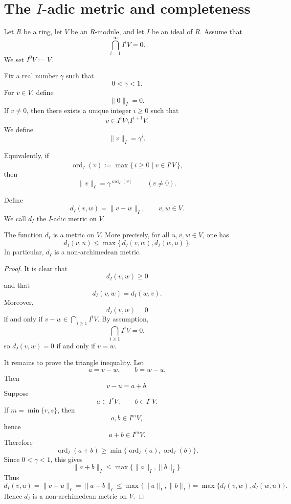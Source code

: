 \section{\texorpdfstring{The \(I\)-adic metric and completeness}{The I-adic metric and completeness}}

Let \(R\) be a ring, let \(V\) be an \(R\)-module, and let \(I\) be an ideal of \(R\).
Assume that
\[
    \bigcap_{i=1}^{\infty} I^i V = 0.
\]
We set \(I^0V:=V\).

Fix a real number \(\gamma\) such that
\[
    0<\gamma<1.
\]
For \(v\in V\), define
\[
    \|0\|_I=0.
\]
If \(v\neq 0\), then there exists a unique integer \(i\geq 0\) such that
\[
    v\in I^iV\setminus I^{i+1}V.
\]
We define
\[
    \|v\|_I=\gamma^i.
\]

Equivalently, if
\[
    \operatorname{ord}_I(v)
    :=
    \max\{\,i\geq 0\mid v\in I^iV\,\},
\]
then
\[
    \|v\|_I=\gamma^{\operatorname{ord}_I(v)}
    \qquad (v\neq 0).
\]

\begin{definition}
    Define
    \[
        d_I(v,w)=\|v-w\|_I,
        \qquad v,w\in V.
    \]
    We call \(d_I\) the \(I\)-adic metric on \(V\).
\end{definition}

\begin{proposition}
    The function \(d_I\) is a metric on \(V\). More precisely, for all
    \(u,v,w\in V\), one has
    \[
        d_I(v,u)
        \leq
        \max\{\,d_I(v,w),d_I(w,u)\,\}.
    \]
    In particular, \(d_I\) is a non-archimedean metric.
\end{proposition}

\begin{proof}
    It is clear that
    \[
        d_I(v,w)\geq 0
    \]
    and that
    \[
        d_I(v,w)=d_I(w,v).
    \]
    Moreover,
    \[
        d_I(v,w)=0
    \]
    if and only if \(v-w\in \bigcap_{i\geq 1} I^iV\). By assumption,
    \[
        \bigcap_{i\geq 1} I^iV=0,
    \]
    so \(d_I(v,w)=0\) if and only if \(v=w\).

    It remains to prove the triangle inequality. Let
    \[
        a=v-w,\qquad b=w-u.
    \]
    Then
    \[
        v-u=a+b.
    \]
    Suppose
    \[
        a\in I^rV,\qquad b\in I^sV.
    \]
    If \(m=\min\{r,s\}\), then
    \[
        a,b\in I^mV,
    \]
    hence
    \[
        a+b\in I^mV.
    \]
    Therefore
    \[
        \operatorname{ord}_I(a+b)
        \geq
        \min\{\operatorname{ord}_I(a),\operatorname{ord}_I(b)\}.
    \]
    Since \(0<\gamma<1\), this gives
    \[
        \|a+b\|_I
        \leq
        \max\{\|a\|_I,\|b\|_I\}.
    \]
    Thus
    \[
        d_I(v,u)
        =
        \|v-u\|_I
        =
        \|a+b\|_I
        \leq
        \max\{\|a\|_I,\|b\|_I\}
        =
        \max\{d_I(v,w),d_I(w,u)\}.
    \]
    Hence \(d_I\) is a non-archimedean metric on \(V\).
\end{proof}

